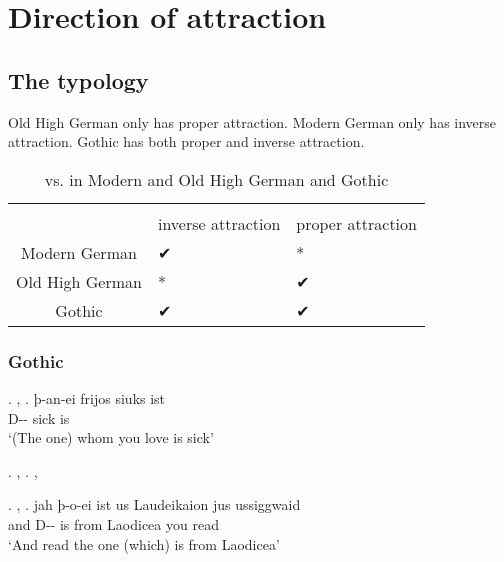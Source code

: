 
\chapter{Direction of attraction}


  \section{The typology}
Old High German only has proper attraction. Modern German only has inverse attraction. Gothic has both proper and inverse attraction.


\begin{table}[h]\label{tbl:intextgoth}
	\center
	\caption { vs.  in Modern and Old High German and Gothic}
	\begin{minipage}{\linewidth}
		\begin{tabularx}{\textwidth}{c *{2}{Y}}
		\toprule
		 								& 				& 				\\
										& inverse attraction	& proper attraction		\\
		\midrule
		Modern German 	& ✔			 							&	*										\\
		Old High German	& *										&	✔										\\
		Gothic					&	✔										&	✔										\\
		\bottomrule
		\end{tabularx}
	\end{minipage}
\end{table}


    \subsection{Gothic}




\ex. , 
\ag. þ-an-ei frijos siuks ist\\
 D-- sick is\\
 `(The one) whom you love is sick'

\ex. , 
\ex. , 

\ex. , 
\ag. jah þ-o-ei ist us Laudeikaion jus ussiggwaid\\
 and D-- is from Laodicea you read\\
 `And read the one (which) is from Laodicea'

